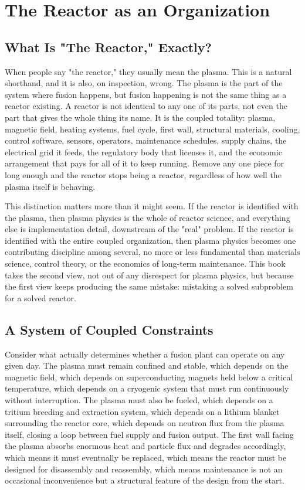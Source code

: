 \chapter{The Reactor as an Organization}

\section{What Is "The Reactor," Exactly?}

When people say "the reactor," they usually mean the plasma. This is a natural shorthand, and it is also, on inspection, wrong. The plasma is the part of the system where fusion happens, but fusion happening is not the same thing as a reactor existing. A reactor is not identical to any one of its parts, not even the part that gives the whole thing its name. It is the coupled totality: plasma, magnetic field, heating systems, fuel cycle, first wall, structural materials, cooling, control software, sensors, operators, maintenance schedules, supply chains, the electrical grid it feeds, the regulatory body that licenses it, and the economic arrangement that pays for all of it to keep running. Remove any one piece for long enough and the reactor stops being a reactor, regardless of how well the plasma itself is behaving.

This distinction matters more than it might seem. If the reactor is identified with the plasma, then plasma physics is the whole of reactor science, and everything else is implementation detail, downstream of the "real" problem. If the reactor is identified with the entire coupled organization, then plasma physics becomes one contributing discipline among several, no more or less fundamental than materials science, control theory, or the economics of long-term maintenance. This book takes the second view, not out of any disrespect for plasma physics, but because the first view keeps producing the same mistake: mistaking a solved subproblem for a solved reactor.

\section{A System of Coupled Constraints}

Consider what actually determines whether a fusion plant can operate on any given day. The plasma must remain confined and stable, which depends on the magnetic field, which depends on superconducting magnets held below a critical temperature, which depends on a cryogenic system that must run continuously without interruption. The plasma must also be fueled, which depends on a tritium breeding and extraction system, which depends on a lithium blanket surrounding the reactor core, which depends on neutron flux from the plasma itself, closing a loop between fuel supply and fusion output. The first wall facing the plasma absorbs enormous heat and particle flux and degrades accordingly, which means it must eventually be replaced, which means the reactor must be designed for disassembly and reassembly, which means maintenance is not an occasional inconvenience but a structural feature of the design from the start.

